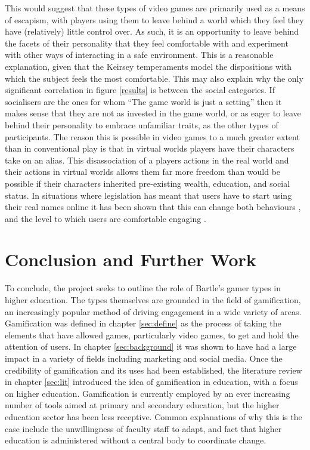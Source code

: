 \documentclass[12pt,a4paper,twoside]{report}
\begin{document}
This would suggest that these types of video games are primarily used as a means of escapism, with players using them to leave behind a world which they feel they have (relatively) little control over. As such, it is an opportunity to leave behind the facets of their personality that they feel comfortable with and experiment with other ways of interacting in a safe environment. This is a reasonable explanation, given that the Keirsey temperaments model the dispositions with which the subject feels the most comfortable. This may also explain why the only significant correlation in figure \ref{results} is between the social categories. If socialisers are the ones for whom ``The game world is just a setting'' \cite{bartle1996hearts} then it makes sense that they are not as invested in the game world, or as eager to leave behind their personality to embrace unfamiliar traits, as the other types of participants. The reason this is possible in video games to a much greater extent than in conventional play is that in virtual worlds players have their characters take on an alias. This disassociation of a players actions in the real world and their actions in virtual worlds allows them far more freedom than would be possible if their characters inherited pre-existing wealth, education, and social status. In situations where legislation has meant that users have to start using their real names online it has been shown that this can change both behaviours \cite{cho2012empirical}, and the level to which users are comfortable engaging \cite{bellonline}.

\chapter{Conclusion and Further Work}
To conclude, the project seeks to outline the role of Bartle's gamer types in higher education. The types themselves are grounded in the field of gamification, an increasingly popular method of driving engagement in a wide variety of areas. Gamification was defined in chapter \ref{sec:define} as the process of taking the elements that have allowed games, particularly video games, to get and hold the attention of users. In chapter \ref{sec:background} it was shown to have had a large impact in a variety of fields including marketing and social media. Once the credibility of gamification and its uses had been established, the literature review in chapter \ref{sec:lit} introduced the idea of gamification in education, with a focus on higher education. Gamification is currently employed by an ever increasing number of tools aimed at primary and secondary education, but the higher education sector has been less receptive. Common explanations of why this is the case include the unwillingness of faculty staff to adapt, and fact that higher education is administered without a central body to coordinate change.
\end{document}
